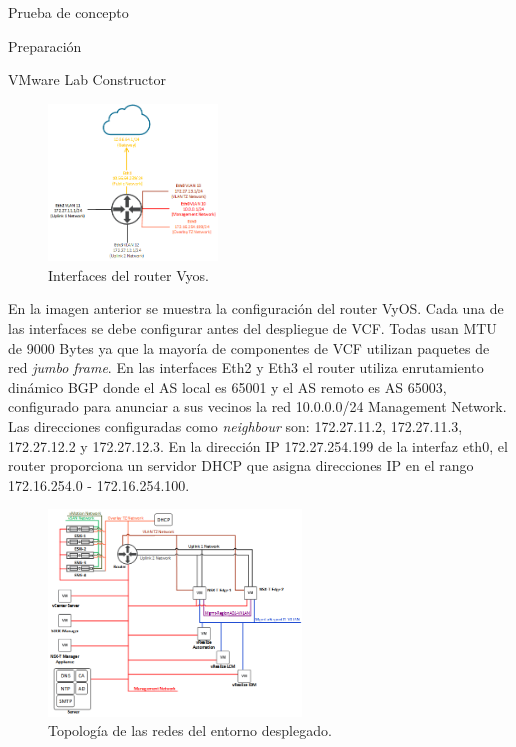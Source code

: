 \begin{section}{Prueba de concepto}
\begin{subsection}{Preparación}
\begin{subsubsection}{VMware Lab Constructor}
    \begin{figure}[h]
      \centering
      \includegraphics[width=0.4\textwidth]{imaxes/pruebaconcepto/RouterFisicoL3.png}
      \caption{Interfaces del router Vyos.}
      \label{fig:interfaces-router-fisico-L3}
    \end{figure}
    \FloatBarrier

    En la imagen anterior se muestra la configuración del router VyOS. Cada una de las interfaces se debe configurar antes del despliegue de VCF. Todas usan MTU de 9000 Bytes ya que la mayoría de componentes de VCF utilizan paquetes de red \textit{jumbo frame}. En las interfaces Eth2 y Eth3 el router utiliza enrutamiento dinámico BGP donde el AS local es 65001 y el AS remoto es AS 65003, configurado para anunciar a sus vecinos la red 10.0.0.0/24 Management Network. Las direcciones configuradas como \textit{neighbour} son: 172.27.11.2, 172.27.11.3, 172.27.12.2 y 172.27.12.3. En la dirección IP 172.27.254.199 de la interfaz eth0, el router proporciona un servidor DHCP que asigna direcciones IP en el rango 172.16.254.0 - 172.16.254.100.
    \FloatBarrier

    \begin{figure}[h]
      \centering
      \includegraphics[width=0.6\textwidth]{imaxes/pruebaconcepto/RedDesdeDentro.png}
      \caption{Topología de las redes del entorno desplegado.}
      \label{fig:red-L3-infraestructura-fisica}
    \end{figure}
    \FloatBarrier


\end{subsubsection}
\end{subsection}
\end{section}
